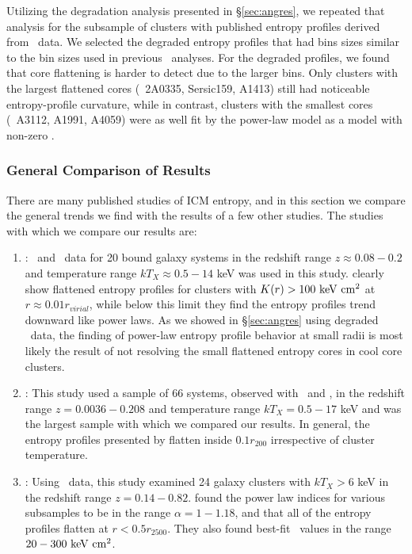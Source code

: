 \documentclass[12pt,preprint]{aastex}
\begin{document}
Utilizing the degradation analysis presented in \S \ref{sec:angres},
we repeated that analysis for the subsample of clusters with published
entropy profiles derived from \xmm\ data. We selected the degraded
entropy profiles that had bins sizes similar to the bin sizes used in
previous \xmm\ analyses. For the degraded profiles, we found that core
flattening is harder to detect due to the larger bins. Only clusters
with the largest flattened cores (\eg\ 2A0335, Sersic159, A1413) still
had noticeable entropy-profile curvature, while in contrast, clusters
with the smallest cores (\eg\ A3112, A1991, A4059) were as well fit by
the power-law model as a model with non-zero \kna.

\subsubsection{General Comparison of Results}

There are many published studies of ICM entropy, and in this section
we compare the general trends we find with the results of a few other
studies. The studies with which we compare our results are:
\begin{enumerate}
\item \citet{davies00}: \rosat\ and \asca\ data for 20 bound galaxy
  systems in the redshift range $z \approx 0.08-0.2$ and temperature
  range $kT_X \approx 0.5-14$ keV was used in this
  study. \citet{davies00} clearly show flattened entropy profiles for
  clusters with $K(r) > 100 \mathrm{\mbox{\ensuremath{\mathrm{~keV}}} \mathrm{\mbox{\ensuremath{\mathrm{~cm}}}^2}}$ at $r \approx 0.01 r_{virial}$,
  while below this limit they find the entropy profiles trend downward
  like power laws. As we showed in \S\ref{sec:angres} using degraded
  \xmm\ data, the finding of power-law entropy profile behavior at
  small radii is most likely the result of not resolving the small
  flattened entropy cores in cool core clusters.
\item \citet{ponman03}: This study used a sample of 66 systems,
  observed with \rosat\ and \asca, in the redshift range $z=
  0.0036-0.208$ and temperature range $kT_X = 0.5-17$ keV and was the
  largest sample with which we compared our results. In general, the
  entropy profiles presented by \citet{ponman03} flatten inside $0.1
  r_{200}$ irrespective of cluster temperature.
\item \citet{morandi07}: Using \chandra\ data, this study examined 24
  galaxy clusters with $kT_X > 6$ keV in the redshift range
  $z=0.14-0.82$. \citet{morandi07} found the power law indices for
  various subsamples to be in the range $\alpha=1-1.18$, and that all
  of the entropy profiles flatten at $r < 0.5r_{2500}$. They also
  found best-fit \kna\ values in the range $20-300 \mathrm{\mbox{\ensuremath{\mathrm{~keV}}} \mathrm{\mbox{\ensuremath{\mathrm{~cm}}}^2}}$.
\end{enumerate}
\end{document}
